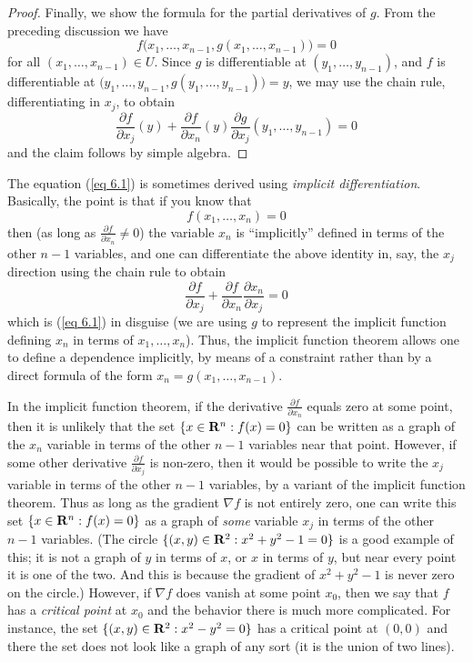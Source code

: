 \begin{proof}
    Finally, we show the formula for the partial derivatives of \(g\).
    From the preceding discussion we have
    \[
        f\big(x_1, \dots, x_{n - 1}, g(x_1, \dots, x_{n - 1})\big) = 0
    \]
    for all \((x_1, \dots, x_{n - 1}) \in U\).
    Since \(g\) is differentiable at \((y_1, \dots, y_{n - 1})\), and \(f\) is differentiable at \(\big(y_1, \dots, y_{n - 1}, g(y_1, \dots, y_{n - 1})\big) = y\), we may use the chain rule, differentiating in \(x_j\), to obtain
    \[
        \frac{\partial f}{\partial x_j}(y) + \frac{\partial f}{\partial x_n}(y) \frac{\partial g}{\partial x_j}(y_1, \dots, y_{n - 1}) = 0
    \]
    and the claim follows by simple algebra.
\end{proof}

\begin{remark}\label{6.8.2}
    The equation (\ref{eq 6.1}) is sometimes derived using \emph{implicit differentiation}.
    Basically, the point is that if you know that
    \[
        f(x_1, \dots, x_n) = 0
    \]
    then (as long as \(\frac{\partial f}{\partial x_n} \neq 0\)) the variable \(x_n\) is ``implicitly'' defined in terms of the other \(n - 1\) variables, and one can differentiate the above identity in, say, the \(x_j\) direction using the chain rule to obtain
    \[
        \frac{\partial f}{\partial x_j} + \frac{\partial f}{\partial x_n} \frac{\partial x_n}{\partial x_j} = 0
    \]
    which is (\ref{eq 6.1}) in disguise
    (we are using \(g\) to represent the implicit function defining \(x_n\) in terms of \(x_1, \dots, x_n\)).
    Thus, the implicit function theorem allows one to define a dependence implicitly, by means of a constraint rather than by a direct formula of the form \(x_n = g(x_1, \dots, x_{n - 1})\).
\end{remark}

\begin{note}
    In the implicit function theorem, if the derivative \(\frac{\partial f}{\partial x_n}\) equals zero at some point, then it is unlikely that the set \(\{x \in \mathbf{R}^n : f(x) = 0\}\) can be written as a graph of the \(x_n\) variable in terms of the other \(n - 1\) variables near that point.
    However, if some other derivative \(\frac{\partial f}{\partial x_j}\) is non-zero, then it would be possible to write the \(x_j\) variable in terms of the other \(n - 1\) variables, by a variant of the implicit function theorem.
    Thus as long as the gradient \(\nabla f\) is not entirely zero, one can write this set \(\{x \in \mathbf{R}^n : f(x) = 0\}\) as a graph of \emph{some} variable \(x_j\) in terms of the other \(n - 1\) variables.
    (The circle \(\{(x, y) \in \mathbf{R}^2 : x^2 + y^2 - 1 = 0\}\) is a good example of this;
    it is not a graph of \(y\) in terms of \(x\), or \(x\) in terms of \(y\), but near every point it is one of the two.
    And this is because the gradient of \(x^2 + y^2 - 1\) is never zero on the circle.)
    However, if \(\nabla f\) does vanish at some point \(x_0\), then we say that \(f\) has a \emph{critical point} at \(x_0\) and the behavior there is much more complicated.
    For instance, the set \(\{(x, y) \in \mathbf{R}^2 : x^2 - y^2 = 0\}\) has a critical point at \((0, 0)\) and there the set does not look like a graph of any sort
    (it is the union of two lines).
\end{note}

